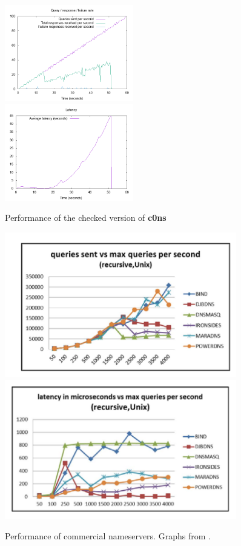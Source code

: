 \documentclass{article}
\newcommand\Kwd[1]{{\sffamily\bfseries{#1}}}
\begin{document}
\begin{figure}[h]
    \includegraphics[width=0.5\textwidth]{checked_rate.png}
    \includegraphics[width=0.5\textwidth]{checked_latency.png}
    \caption{Performance of the checked version of \Kwd{c0ns}}\label{fig:checked-perf}
\end{figure}

\begin{figure}[h]
    \includegraphics[width=0.9\textwidth]{Fagin_rate.png}
    \includegraphics[width=0.9\textwidth]{Fagin_latency.png}
    \caption{Performance of commercial nameservers. Graphs from \cite{fagin2017making}.}\label{fig:commercial-perf}
\end{figure}
\end{document}
